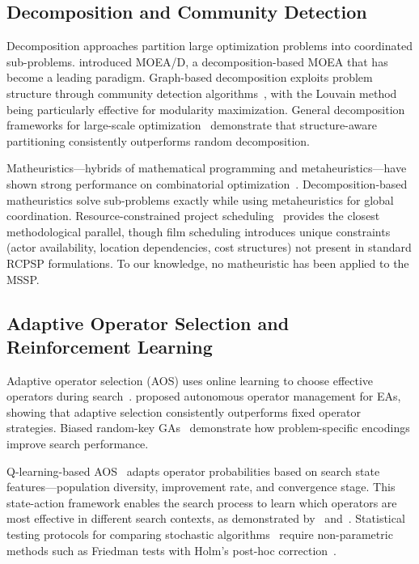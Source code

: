 \subsection{Decomposition and Community Detection}

Decomposition approaches partition large optimization problems into coordinated sub-problems.
\citet{zhang2007} introduced MOEA/D, a decomposition-based MOEA that has become a leading paradigm.
Graph-based decomposition exploits problem structure through community detection algorithms~\citep{fortunato2010, girvan2002}, with the Louvain method~\citep{blondel2008} being particularly effective for modularity maximization.
General decomposition frameworks for large-scale optimization~\citep{rahimian2017} demonstrate that structure-aware partitioning consistently outperforms random decomposition.

Matheuristics---hybrids of mathematical programming and metaheuristics---have shown strong performance on combinatorial optimization~\citep{maniezzo2010, jourdan2009}.
Decomposition-based matheuristics solve sub-problems exactly while using metaheuristics for global coordination.
Resource-constrained project scheduling~\citep{hartmann2010, kolisch2006, pinedo2016} provides the closest methodological parallel, though film scheduling introduces unique constraints (actor availability, location dependencies, cost structures) not present in standard RCPSP formulations.
To our knowledge, no matheuristic has been applied to the MSSP.

\subsection{Adaptive Operator Selection and Reinforcement Learning}

Adaptive operator selection (AOS) uses online learning to choose effective operators during search~\citep{karafotias2015}.
\citet{maturana2010} proposed autonomous operator management for EAs, showing that adaptive selection consistently outperforms fixed operator strategies.
Biased random-key GAs~\citep{goncalves2011} demonstrate how problem-specific encodings improve search performance.

Q-learning-based AOS~\citep{watkins1992, sutton1998} adapts operator probabilities based on search state features---population diversity, improvement rate, and convergence stage.
This state-action framework enables the search process to learn which operators are most effective in different search contexts, as demonstrated by~\citet{li2014} and~\citet{fialho2008}.
Statistical testing protocols for comparing stochastic algorithms~\citep{garcia2009, demsar2006} require non-parametric methods such as Friedman tests with Holm's post-hoc correction~\citep{holm1979}.

